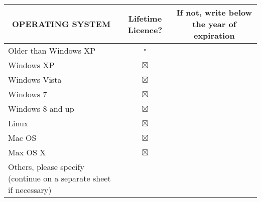 \documentclass[a4paper,10pt, total={10.95in, 8in}]{article} %
\begin{document}
\begin{table}[H]
\renewcommand{\arraystretch}{1.5}
\centering
\begin{adjustbox}{width=6.5in}
\begin{tabular}{|p{6.5cm}|c|l|}
\hline
\multicolumn{1}{|c|}{OPERATING SYSTEM}                             & Lifetime Licence?\footnotemark[5] & \multicolumn{1}{c|}{If not, write below the year of expiration} \\ \hline
Older than Windows XP                                              & \Large$\square$       & \multicolumn{1}{c|}{\textbf{}}                                  \\ \hline
Windows XP                                                         & \Large$\boxtimes$       & \multicolumn{1}{c|}{\textbf{}}                                  \\ \hline
Windows Vista                                                      & \Large$\boxtimes$       & \multicolumn{1}{c|}{}                                           \\ \hline
Windows 7                                                          & \Large$\boxtimes$       & \multicolumn{1}{c|}{}                                           \\ \hline
Windows 8 and up                                                   & \Large$\boxtimes$       &                                                                 \\ \hline
Linux                                                              & \Large$\boxtimes$       &                                                                 \\ \hline
Mac OS                                                             & \Large$\boxtimes$       &                                                                 \\ \hline
Max OS X                                                           & \Large$\boxtimes$       &                                                                 \\ \hline
Others, please specify (continue on a separate sheet if necessary) &        &                                                                 \\ \hline
\end{tabular}
\end{adjustbox}
\end{table}
\end{document}
